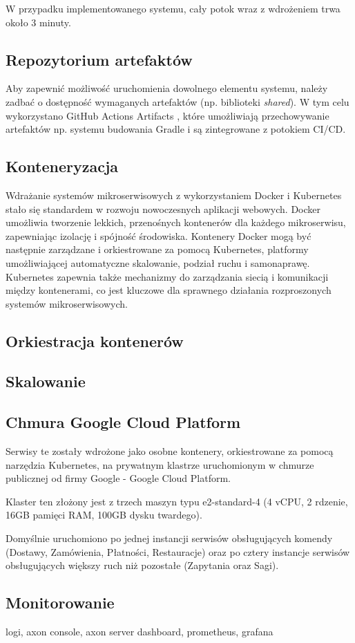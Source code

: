 W przypadku implementowanego systemu, cały potok wraz z wdrożeniem trwa około 3 minuty.

\subsection{Repozytorium artefaktów}

Aby zapewnić możliwość uruchomienia dowolnego elementu systemu, należy zadbać o dostępność wymaganych artefaktów (np. biblioteki \textit{shared}). W tym celu wykorzystano GitHub Actions Artifacts \cite{gaa}, które umożliwiają przechowywanie artefaktów np. systemu budowania Gradle i są zintegrowane z potokiem CI/CD.

\subsection{Konteneryzacja}

Wdrażanie systemów mikroserwisowych z wykorzystaniem Docker i Kubernetes stało się standardem w rozwoju nowoczesnych aplikacji webowych. Docker umożliwia tworzenie lekkich, przenośnych kontenerów dla każdego mikroserwisu, zapewniając izolację i spójność środowiska. Kontenery Docker mogą być następnie zarządzane i orkiestrowane za pomocą Kubernetes, platformy umożliwiającej automatyczne skalowanie, podział ruchu  i samonaprawę. Kubernetes zapewnia także mechanizmy do zarządzania siecią i komunikacji między kontenerami, co jest kluczowe dla sprawnego działania rozproszonych systemów mikroserwisowych.

\subsection{Orkiestracja kontenerów}

\subsection{Skalowanie}

\subsection{Chmura Google Cloud Platform}

Serwisy te zostały wdrożone jako osobne kontenery, orkiestrowane za pomocą narzędzia Kubernetes, na prywatnym klastrze uruchomionym w chmurze publicznej od firmy Google - Google Cloud Platform.

Klaster ten złożony jest z trzech maszyn typu e2-standard-4 (4 vCPU, 2 rdzenie, 16GB pamięci RAM, 100GB dysku twardego).

Domyślnie uruchomiono po jednej instancji serwisów obsługujących komendy (Dostawy, Zamówienia, Płatności, Restauracje) oraz po cztery instancje serwisów obsługujących większy ruch niż pozostałe (Zapytania oraz Sagi).

\subsection{Monitorowanie}

logi, axon console, axon server dashboard, prometheus, grafana